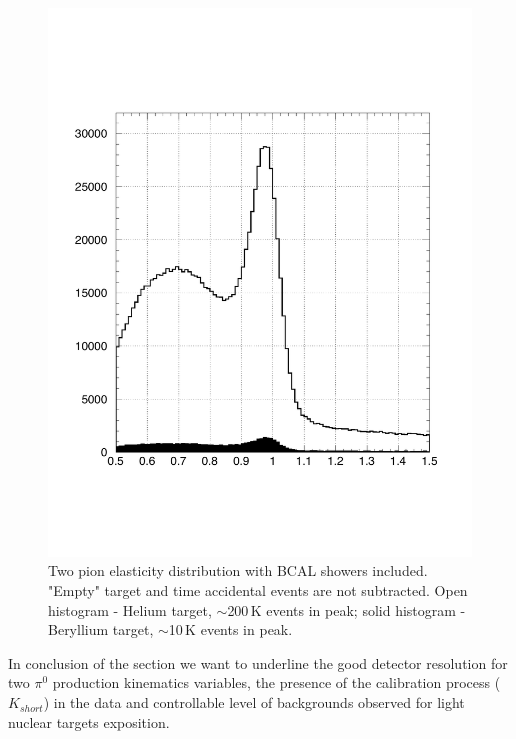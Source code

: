 \begin{figure}[!h]
\centering\includegraphics[width=4.5in]{figures/elast_2pi0_hevsbe}
\caption{Two pion elasticity distribution with BCAL showers included. "Empty" target and time accidental events are not subtracted. Open histogram - Helium target, $\sim$200$\,$K events in peak; solid histogram - Beryllium target, $\sim$10$\,$K events in peak.
\label{fig:beheelast}}
\end{figure}


In conclusion of the section we want to underline the good detector resolution for two $\pi^0$ production kinematics variables, the presence of the calibration process ($K_{short}$) in the data and controllable level of backgrounds observed for light nuclear targets exposition.